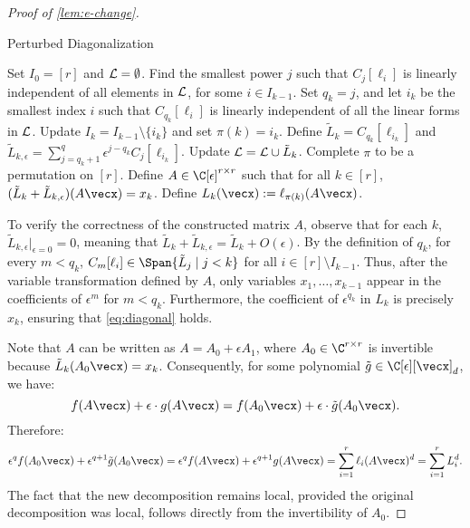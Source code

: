 \documentclass{article}
\begin{document}
\begin{proof}[Proof of \autoref{lem:e-change}]
    \begin{algorithm}[H]
    \caption{Perturbed Diagonalization}\label{alg:diagonal}
        \begin{algorithmic}[1] 
            \State Set $I_0 = [r]$ and ${\cal L} = \emptyset$.
                \State Find the smallest power $j$ such that $C_j[\ell_i]$ is linearly independent of all elements in ${\cal L}$, for some $i \in I_{k-1}$.
                \State Set $q_k = j$, and let $i_k$ be the smallest index $i$ such that $C_{q_k}[\ell_i]$ is linearly independent of all the linear forms in ${\cal L}$.
                \State Update $I_k = I_{k-1} \setminus \{i_k\}$ and set $\pi(k) = i_k$.
                \State Define $\tilde{L}_k = C_{q_k}[\ell_{i_k}]$ and $\tilde{L}_{k,\epsilon} = \sum_{j = q_k+1}^{q} \epsilon^{j-q_k} C_j[\ell_{i_k}]$.
                \State Update ${\cal L} = {\cal L} \cup \tilde{L}_k$.
            \EndFor
            \State Complete $\pi$ to be a permutation on $[r]$.
            \State Define $A \in \C[\epsilon]^{r \times r}$ such that for all $k \in [r]$, $(\tilde{L}_k + \tilde{L}_{k,\epsilon})(A\vecx) = x_k$.
            \State Define $L_k(\vecx) := \ell_{\pi(k)}(A\vecx)$.
        \end{algorithmic}
    \end{algorithm}



    To verify the correctness of the constructed matrix $A$, observe that for each $k$, $\tilde{L}_{k,\epsilon}|_{\epsilon=0} = 0$, meaning that $\tilde{L}_k + \tilde{L}_{k,\epsilon} = \tilde{L}_k + O(\epsilon)$. By the definition of $q_k$, for every $m < q_k$, $C_m[\ell_i] \in \Span\{\tilde{L}_j \mid j < k\}$ for all $i \in [r]\setminus I_{k-1}$. Thus, after the variable transformation defined by $A$, only variables $x_1, \ldots, x_{k-1}$ appear in the coefficients of $\epsilon^m$ for $m < q_k$. Furthermore, the coefficient of $\epsilon^{q_k}$ in $L_k$ is precisely $x_k$, ensuring that \eqref{eq:diagonal} holds.


    Note that $A$ can be written as $A = A_0 + \epsilon A_1$, where $A_0 \in \C^{r \times r}$ is invertible because $\tilde{L}_k(A_0\vecx) = x_k$. Consequently, for some polynomial $\tilde{g} \in \C[\epsilon][\vecx]_d$, we have:
    \[
    f(A\vecx) + \epsilon \cdot g(A\vecx) = f(A_0\vecx) + \epsilon \cdot \tilde{g}(A_0\vecx).
    \]
    Therefore:
    \[
    \epsilon^q f(A_0\vecx) + \epsilon^{q+1} \tilde{g}(A_0\vecx) = \epsilon^q f(A\vecx) + \epsilon^{q+1}g(A\vecx) = \sum_{i=1}^{r}\ell_i(A\vecx)^d = \sum_{i=1}^{r}L_i^d.
    \]
The fact that the new decomposition remains local, provided the original decomposition was local, follows directly from the invertibility of $A_0$.
\end{proof}
\end{document}
